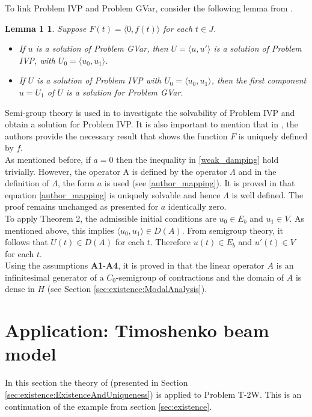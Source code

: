 \documentclass[../../main.tex]{subfiles}
\begin{document}
To link Problem IVP and Problem GVar, consider the following lemma from \cite{VV02}.

\newtheorem*{Prop}{Lemma 1}
\begin{Prop}
	Suppose $F(t) = \langle 0, f(t) \rangle$ for each $t\in J$.
	\begin{itemize}
		\item[a)] If $u$ is a solution of Problem GVar, then $U = \langle u, u' \rangle$ is a solution of Problem IVP, with $U_0 = \langle u_0, u_1 \rangle$.
		\item[b)] If $U$ is a solution of Problem IVP with $U_0 = \langle u_0, u_1 \rangle$, then the first component $u = U_1$ of $U$ is a solution for Problem GVar.
	\end{itemize}
\end{Prop}

Semi-group theory is used in \cite{VV02} to investigate the solvability of Problem IVP and obtain a solution for Problem IVP. It is also important to mention that in \cite{VV02}, the authors provide the necessary result that shows the function $F$ is uniquely defined by $f$.\\

As mentioned before, if $a = 0$ then the inequality in \eqref{weak_damping} hold trivially. However, the operator A is defined by the operator $\Lambda$ and in the definition of $\Lambda$, the form $a$ is used (see \eqref{author_mapping}). It is proved in \cite{VV02} that equation \eqref{author_mapping} is uniquely solvable and hence $\Lambda$ is well defined. The proof remains unchanged as presented for $a$ identically zero.\\

To apply Theorem 2, the admissible initial conditions are $u_0 \in E_b$ and $u_1 \in V$. As mentioned above, this implies $\langle u_0, u_1 \rangle \in D(A)$. From semigroup theory, it follows that $U(t) \in D(A)$ for each $t$. Therefore $u(t) \in E_b$ and $u'(t) \in V$ for each $t$.\\

Using the assumptions \textbf{A1}-\textbf{A4}, it is proved in \cite{VV02} that the linear operator $A$ is an infinitesimal generator of a $C_0$-semigroup of contractions and the domain of $A$ is dense in $H$ (see Section \ref{sec:existence:ModalAnalysis}).

\section{Application: Timoshenko beam model}\label{sec:existence:Application}
In this section the theory of \cite{VV02} (presented in Section \ref{sec:existence:ExistenceAndUniqueness}) is applied to Problem T-2W. This is an continuation of the example from section \ref{sec:existence}.\\
\end{document}
